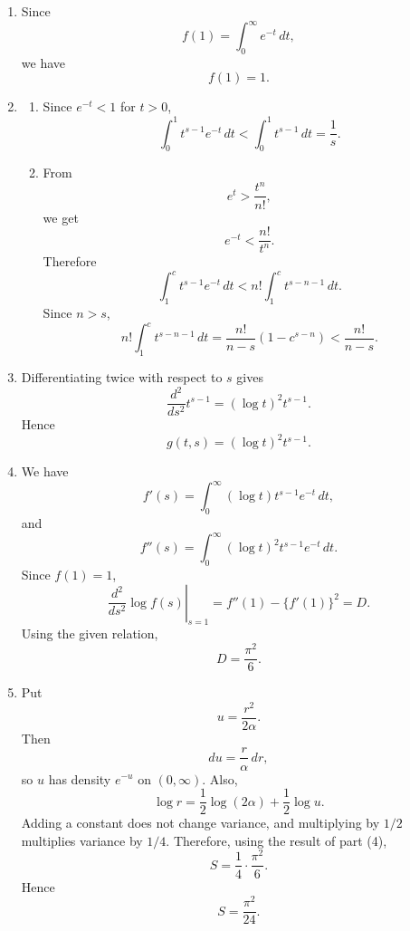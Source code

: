 \documentclass[10pt,a4paper]{article}
\begin{document}
\begin{enumerate}
  \item Since
        \[
          f(1)=\int_0^\infty e^{-t}\,dt,
        \]
        we have
        \[
          \boxed{f(1)=1.}
        \]

  \item
        \begin{enumerate}
          \item Since $e^{-t}<1$ for $t>0$,
                \[
                  \int_0^1t^{s-1}e^{-t}\,dt
                  <
                  \int_0^1t^{s-1}\,dt
                  =
                  \frac1s.
                \]

          \item From
                \[
                  e^t>\frac{t^n}{n!},
                \]
                we get
                \[
                  e^{-t}<\frac{n!}{t^n}.
                \]
                Therefore
                \[
                  \int_1^c t^{s-1}e^{-t}\,dt
                  <
                  n!\int_1^c t^{s-n-1}\,dt.
                \]
                Since $n>s$,
                \[
                  n!\int_1^c t^{s-n-1}\,dt
                  =
                  \frac{n!}{n-s}\left(1-c^{s-n}\right)
                  <
                  \frac{n!}{n-s}.
                \]
        \end{enumerate}

  \item Differentiating twice with respect to $s$ gives
        \[
          \frac{d^2}{ds^2}t^{s-1}
          =
          (\log t)^2t^{s-1}.
        \]
        Hence
        \[
          \boxed{
          g(t,s)=(\log t)^2t^{s-1}.}
        \]

  \item We have
        \[
          f'(s)=\int_0^\infty(\log t)t^{s-1}e^{-t}\,dt,
        \]
        and
        \[
          f''(s)=\int_0^\infty(\log t)^2t^{s-1}e^{-t}\,dt.
        \]
        Since $f(1)=1$,
        \[
          \left.\frac{d^2}{ds^2}\log f(s)\right|_{s=1}
          =
          f''(1)-\{f'(1)\}^2
          =
          D.
        \]
        Using the given relation,
        \[
          \boxed{D=\frac{\pi^2}{6}.}
        \]

  \item Put
        \[
          u=\frac{r^2}{2\alpha}.
        \]
        Then
        \[
          du=\frac{r}{\alpha}\,dr,
        \]
        so $u$ has density $e^{-u}$ on $(0,\infty)$. Also,
        \[
          \log r=\frac12\log(2\alpha)+\frac12\log u.
        \]
        Adding a constant does not change variance, and multiplying by $1/2$ multiplies variance by $1/4$. Therefore, using the result of part (4),
        \[
          S=\frac14\cdot\frac{\pi^2}{6}.
        \]
        Hence
        \[
          \boxed{S=\frac{\pi^2}{24}.}
        \]
\end{enumerate}
\end{document}
